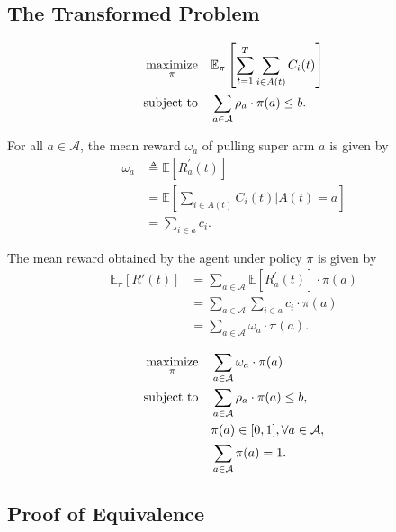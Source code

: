 \documentclass[12pt, a4paper]{article}
\begin{document}
\subsection{The Transformed Problem}

\[
\begin{aligned}
	\mathop {\rm{maximize}}_{\pi} \quad & \mathbb{E}_{\pi} \left[ \sum\limits_{t = 1}^{T} \sum\limits_{i \in A(t)} C_i (t) \right]\\
	\rm{subject~to} \quad & \sum\limits_{a \in \mathcal{A}} \rho_a \cdot \pi(a) \leq b.
\end{aligned}
\]

For all $a \in \mathcal{A}$, the mean reward $\omega_a$ of pulling super arm $a$ is given by
\begin{align}
	\omega_a &\triangleq \mathbb{E} \left[ R_a^' (t) \right]\\
	&= \mathbb{E} \left[ \sum\limits_{i \in A(t)} C_i (t) \Big\vert A(t) = a \right]\\
	&= \sum\limits_{i \in a} c_i.
\end{align}

The mean reward obtained by the agent under policy $\pi$ is given by
\begin{align*}
	\mathbb{E}_{\pi} \left[ R' (t) \right] &= \sum\limits_{a \in \mathcal{A}} \mathbb{E} \left[ R^'_a (t) \right] \cdot \pi (a)\\
	&= \sum\limits_{a \in \mathcal{A}} \sum\limits_{i \in a} c_i \cdot \pi(a)\\
	&= \sum\limits_{a \in \mathcal{A}} \omega_a \cdot \pi(a).
\end{align*}

\begin{align}
	\begin{split}
		\mathop {\rm{maximize}}_{\pi} \quad & \sum\limits_{a \in \mathcal{A}} \omega_a \cdot \pi (a)\\
		\rm{subject~to} \quad & \sum\limits_{a \in \mathcal{A}} \rho_a \cdot \pi(a) \leq b,\\
		& \pi(a) \in [0, 1], \forall a \in \mathcal{A},\\
		& \sum\limits_{a \in \mathcal{A}} \pi(a) = 1.
		\label{eq:optimization_problem_transformed}
	\end{split}
\end{align}

\subsection{Proof of Equivalence}
\end{document}
